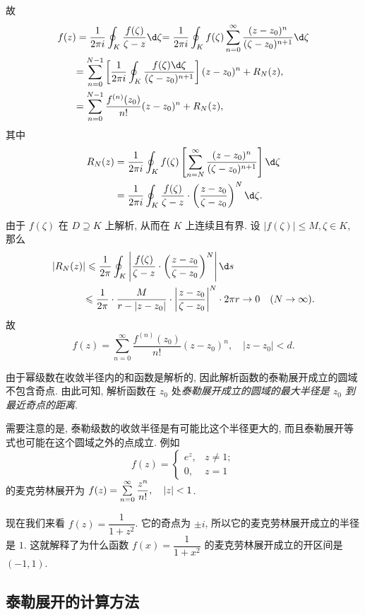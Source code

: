 故
\begin{align*}
	f(z)&=\frac1{2\pi i}\oint_K \frac{f(\zeta)}{\zeta-z}\d\zeta
	{=\frac1{2\pi i}\oint_K f(\zeta)\sum_{n=0}^\infty\frac{(z-z_0)^n}{(\zeta-z_0)^{n+1}}\d\zeta}\\
	&{=
	\sum_{n=0}^{N-1}\left[\frac1{2\pi i}\oint_K\frac{f(\zeta)\d\zeta}{(\zeta-z_0)^{n+1}}\right](z-z_0)^n+R_N(z),}\\
	&{=
	\sum_{n=0}^{N-1}\frac{f^{(n)}(z_0)}{n!}(z-z_0)^n+R_N(z),}
\end{align*}
其中
\begin{align*}
	R_N(z)&=\frac1{2\pi i}\oint_Kf(\zeta)\left[\sum_{n=N}^\infty\frac{(z-z_0)^n}{(\zeta-z_0)^{n+1}}\right]\d\zeta\\
	&=\frac1{2\pi i}\oint_K\frac{f(\zeta)}{\zeta-z}\cdot\left(\frac{z-z_0}{\zeta-z_0}\right)^N\d\zeta.
\end{align*}

由于 $f(\zeta)$ 在 $D\supseteq K$ 上解析, 从而在 $K$ 上连续且有界.
设 $|f(\zeta)|\le M,\zeta\in K$,
那么
\begin{align*}
	|R_N(z)|&\le\frac 1{2\pi}\oint_K\abs{\frac{f(\zeta)}{\zeta-z}\cdot\left(\frac{z-z_0}{\zeta-z_0}\right)^N}\d s\\
	&{\le\frac 1{2\pi}\cdot \frac M{r-|z-z_0|}\cdot\abs{\frac{z-z_0}{\zeta-z_0}}^N\cdot 2\pi r\to 0\quad (N\to\infty).}
\end{align*}
故
\[f(z)=\sum_{n=0}^\infty\frac{f^{(n)}(z_0)}{n!}(z-z_0)^n,\quad |z-z_0|<d.\]

由于幂级数在收敛半径内的和函数是解析的, 因此解析函数的泰勒展开成立的圆域不包含奇点.
由此可知, 解析函数在 $z_0$ 处\emph{泰勒展开成立的圆域的最大半径是 $z_0$ 到最近奇点的距离}.

需要注意的是, 泰勒级数的收敛半径是有可能比这个半径更大的,
而且泰勒展开等式也可能在这个圆域之外的点成立.
例如 
\[f(z)=\begin{cases}
	e^z,&z\neq 1;\\
	0,&z=1
\end{cases}\]
的麦克劳林展开为 $f(z)=\sum\limits_{n=0}^\infty \dfrac{z^n}{n!},\quad |z|<1$.

现在我们来看 $f(z)=\dfrac1{1+z^2}$.
它的奇点为 $\pm i$, 所以它的麦克劳林展开成立的半径是 $1$.
这就解释了为什么函数 $f(x)=\dfrac1{1+x^2}$ 的麦克劳林展开成立的开区间是 $(-1,1)$.

\subsection{泰勒展开的计算方法}

